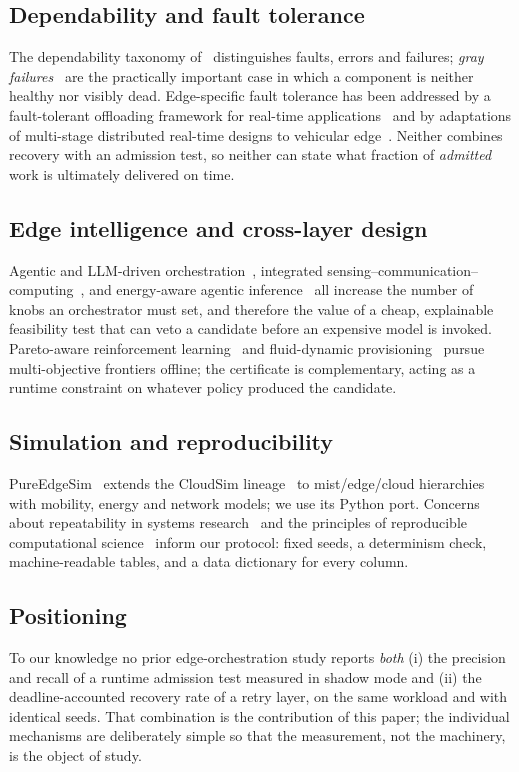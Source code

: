 \documentclass[journal,10pt]{IEEEtran}
\begin{document}
\subsection{Dependability and fault tolerance}
The dependability taxonomy of~\cite{avizienis2004dependable} distinguishes
faults, errors and failures; \emph{gray failures}~\cite{huang2017gray} are the
practically important case in which a component is neither healthy nor visibly
dead. Edge-specific fault tolerance has been addressed by a fault-tolerant
offloading framework for real-time applications~\cite{gao2026faulttolerant} and
by adaptations of multi-stage distributed real-time designs to vehicular
edge~\cite{kumar2026multistage}. Neither combines recovery with an admission
test, so neither can state what fraction of \emph{admitted} work is ultimately
delivered on time.

\subsection{Edge intelligence and cross-layer design}
Agentic and LLM-driven orchestration~\cite{chari2026ragam,he2026workflow},
integrated sensing--communication--computing~\cite{liu2026iscc,li2026semantic},
and energy-aware agentic inference~\cite{chen2026agenticenergy} all increase the
number of knobs an orchestrator must set, and therefore the value of a cheap,
explainable feasibility test that can veto a candidate before an expensive
model is invoked. Pareto-aware reinforcement learning~\cite{xu2026paretoRL} and
fluid-dynamic provisioning~\cite{dong2026digitaltides} pursue multi-objective
frontiers offline; the certificate is complementary, acting as a runtime
constraint on whatever policy produced the candidate.

\subsection{Simulation and reproducibility}
PureEdgeSim~\cite{mechalikh2021pureedgesim} extends the CloudSim
lineage~\cite{calheiros2011cloudsim} to mist/edge/cloud hierarchies with
mobility, energy and network models; we use its Python port. Concerns about
repeatability in systems research~\cite{collberg2016repeatability} and the
principles of reproducible computational
science~\cite{peng2011reproducible} inform our protocol: fixed seeds, a
determinism check, machine-readable tables, and a data dictionary for every
column.

\subsection{Positioning}
To our knowledge no prior edge-orchestration study reports \emph{both}
(i) the precision and recall of a runtime admission test measured in shadow
mode and (ii) the deadline-accounted recovery rate of a retry layer, on the
same workload and with identical seeds. That combination is the contribution
of this paper; the individual mechanisms are deliberately simple so that the
measurement, not the machinery, is the object of study.
\end{document}
